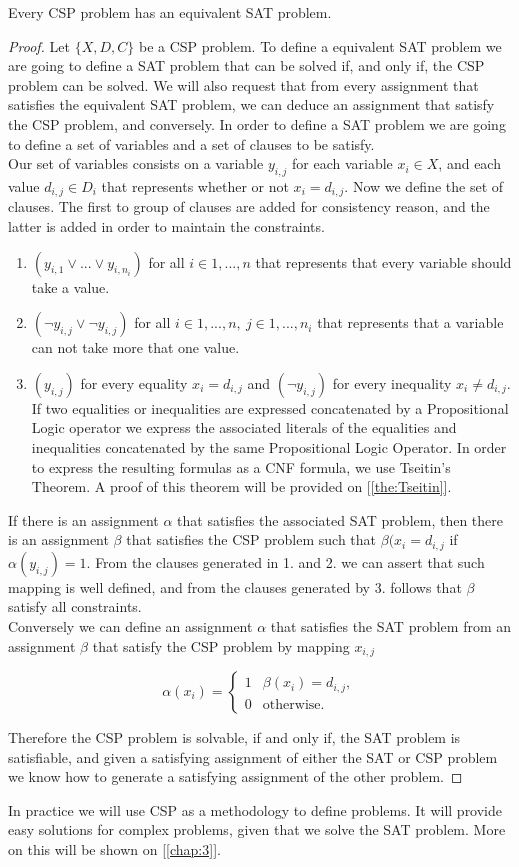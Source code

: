 \begin{proposition}
  Every CSP problem has an equivalent SAT problem.
\end{proposition}
\begin{proof}
  Let $ \{X,D,C\}$ be a CSP problem. To define a equivalent SAT problem we are going to define a SAT problem that can be solved if, and only if, the CSP problem can be solved. We will also request that from every assignment that satisfies the equivalent SAT problem, we can deduce an assignment that satisfy the CSP problem, and conversely. In order to define a SAT problem we are going to define a set of variables and a set of clauses to be satisfy.\\

  Our set of variables consists on a variable $y_{i,j}$ for each variable $x_i\in X$, and each value $d_{i,j}\in D_i$ that represents whether or not $x_i = d_{i,j}$. Now we define the set of clauses. The first to group of clauses are added for consistency reason, and the latter is added in order to maintain the constraints.
  \begin{enumerate}
  \item $(y_{i,1}\vee ... \vee y_{i,n_i})$ for all $i\in 1,...,n$ that represents that every variable should take a value.
  \item $(\neg y_{i,j} \vee \neg y_{i,j})$ for all $i\in 1,...,n,\ j\in 1,...,n_i$ that represents that a variable can not take more that one value.
  \item $(y_{i,j})$ for every equality $x_i = d_{i,j}$ and $(\neg y_{i,j})$ for every inequality $x_i \ne d_{i,j}$. If two equalities or inequalities are expressed concatenated by a Propositional Logic operator we express the associated literals of the equalities and inequalities concatenated by the same Propositional Logic Operator. In order to express the resulting formulas as a CNF formula, we use Tseitin's Theorem. A proof of this theorem will be provided on [\ref{the:Tseitin}].
  \end{enumerate}

  If there is an assignment $\alpha$ that satisfies the associated SAT problem, then there is an assignment $\beta$ that satisfies the CSP problem such that $\beta(x_i=d_{i,j}$ if $\alpha(y_{i,j}) = 1$. From the clauses generated in 1. and 2. we can assert that such mapping is well defined, and from the clauses generated by 3. follows that $\beta$ satisfy all constraints.\\

  Conversely we can define an assignment $\alpha$ that satisfies the SAT problem from an assignment $\beta$ that satisfy the CSP problem by mapping $x_{i,j}$ 

$$
\alpha(x_{i})=
\begin{cases}
  1 & \beta(x_{i}) = d_{i,j},\\
  0 & \text{otherwise}.
\end{cases}
$$

Therefore the CSP problem is solvable, if and only if, the SAT problem is satisfiable, and given a satisfying assignment of either the SAT or CSP problem we know how to generate a satisfying assignment of the other problem.
\end{proof}

In practice we will use CSP as a methodology to define problems. It will provide easy solutions for complex problems, given that we solve the SAT problem. More on this will be shown on [\ref{chap:3}].
